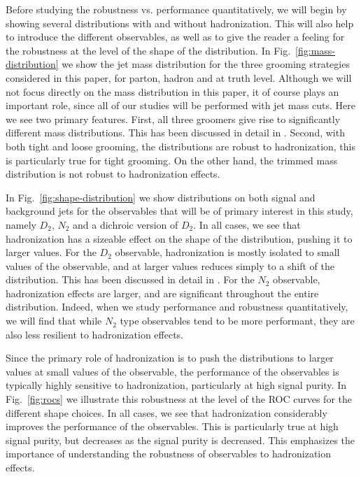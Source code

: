 \documentclass[11pt,letterpaper]{article}
\DeclareRobustCommand{\Fig}[1]{Fig.~\ref{#1}}
\begin{document}
Before studying the robustness vs. performance quantitatively, we will begin by showing several distributions with and without hadronization. This will also help to introduce the different observables, as well as to give the reader a feeling for the robustness at the level of the shape of the distribution. In \Fig{fig:mass-distribution} we show the jet mass distribution for the three grooming strategies considered in this paper, for parton, hadron and at truth level. Although we will not focus directly on the mass distribution in this paper, it of course plays an important role, since all of our studies will be performed with jet mass cuts. Here we see two primary features. First, all three groomers give rise to significantly different mass distributions. This has been discussed in detail in \cite{}. Second, with both tight and loose grooming, the distributions are robust to hadronization, this is particularly true for tight grooming. On the other hand, the trimmed mass distribution is not robust to hadronization effects. 

In \Fig{fig:shape-distribution} we show distributions on both signal and background jets for the observables that will be of primary interest in this study, namely $D_2$, $N_2$ and a dichroic version of $D_2$.   In all cases, we see that hadronization has a sizeable effect on the shape of the distribution, pushing it to larger values. For the $D_2$ observable, hadronization is mostly isolated to small values of the observable, and at larger values reduces simply to a shift of the distribution. This has been discussed in detail in \cite{}. For the $N_2$ observable, hadronization effects are larger, and are significant throughout the entire distribution. Indeed, when we study performance and robustness quantitatively, we will find that while $N_2$ type observables tend to be more performant, they are also less resilient to hadronization effects. 

Since the primary role of hadronization is to push the distributions to larger values at small values of the observable, the performance of the observables is typically highly sensitive to hadronization, particularly at high signal purity. In \Fig{fig:rocs} we illustrate this robustness at the level of the ROC curves for the different shape choices. In all cases, we see that hadronization considerably improves the performance of the observables. This is particularly true at high signal purity, but decreases as the signal purity is decreased. This emphasizes the importance of understanding the robustness of observables to hadronization effects.
\end{document}
